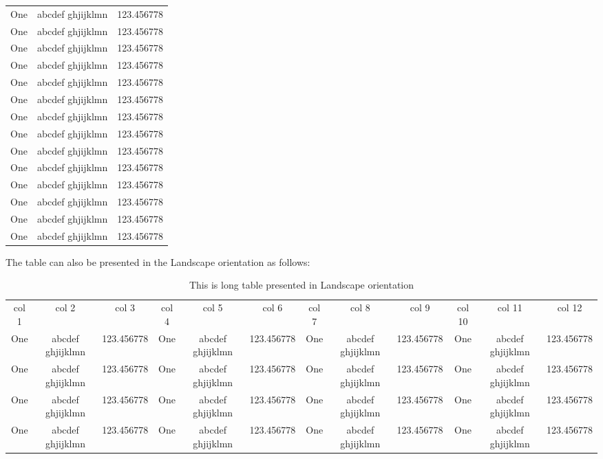 \begin{spacing}{1.5}
\begin{longtable}{|l|l|l|}
	One & abcdef ghjijklmn & 123.456778 \\
	One & abcdef ghjijklmn & 123.456778 \\
	One & abcdef ghjijklmn & 123.456778 \\
	One & abcdef ghjijklmn & 123.456778 \\
	One & abcdef ghjijklmn & 123.456778 \\
	One & abcdef ghjijklmn & 123.456778 \\
	One & abcdef ghjijklmn & 123.456778 \\
	One & abcdef ghjijklmn & 123.456778 \\
	One & abcdef ghjijklmn & 123.456778 \\
	One & abcdef ghjijklmn & 123.456778 \\
	One & abcdef ghjijklmn & 123.456778 \\
	One & abcdef ghjijklmn & 123.456778 \\
	One & abcdef ghjijklmn & 123.456778 \\
	One & abcdef ghjijklmn & 123.456778 \\
\end{longtable}

The table can also be presented in the Landscape orientation as follows: 
\begin{table}
	\centering
	\caption{This is long table presented in Landscape orientation}
	\begin{tabular}{|c|c|c|c|c|c|c|c|c|c|c|c}
		\hline
		col 1 & col 2 & col 3 & col 4 & col 5 & col 6 & col 7 & col 8 & col 9 & col 10 & col 11 & col 12 \\
		One & abcdef ghjijklmn & 123.456778 & One & abcdef ghjijklmn & 123.456778 & One & abcdef ghjijklmn & 123.456778 & One & abcdef ghjijklmn &  123.456778 \\
		One & abcdef ghjijklmn & 123.456778 & One & abcdef ghjijklmn & 123.456778 & One & abcdef ghjijklmn & 123.456778 & One & abcdef ghjijklmn &  123.456778 \\
		One & abcdef ghjijklmn & 123.456778 & One & abcdef ghjijklmn & 123.456778 & One & abcdef ghjijklmn & 123.456778 & One & abcdef ghjijklmn &  123.456778 \\
		One & abcdef ghjijklmn & 123.456778 & One & abcdef ghjijklmn & 123.456778 & One & abcdef ghjijklmn & 123.456778 & One & abcdef ghjijklmn &  123.456778 \\
		\hline
	\end{tabular}
\end{table}	



\end{spacing}
